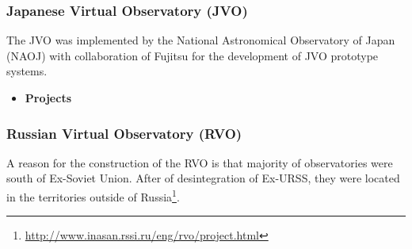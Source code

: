 \subsubsection{Japanese Virtual Observatory (JVO)}
The JVO was implemented by the National Astronomical Observatory
of Japan (NAOJ) with collaboration of Fujitsu for the development of JVO
prototype systems.

\begin{itemize}
	\item \textbf{Projects}
\end{itemize}

\subsubsection{Russian Virtual Observatory (RVO)}
A reason for the construction of the RVO is that majority of observatories were
south of Ex-Soviet Union. After of desintegration of Ex-URSS, they were located
in the territories outside of
Russia\footnote{\url{http://www.inasan.rssi.ru/eng/rvo/project.html}}.

